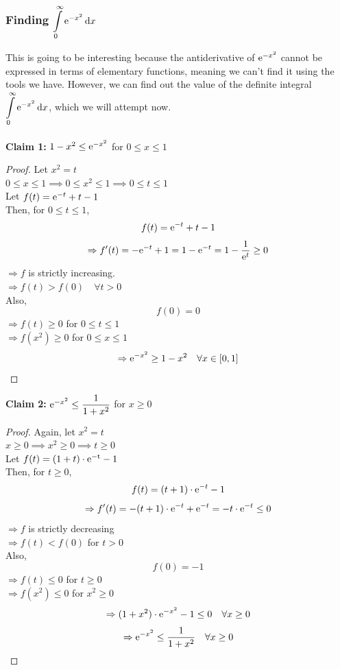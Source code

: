 \documentclass[14]{article}
\theoremstyle{definition}
\theoremstyle{case}
\begin{document}
\subsubsection{Finding $\displaystyle\int\limits_0^{\infty} {\rm e}^{-x^2} \dif x$}
This is going to be interesting because the antiderivative of ${\rm e}^{-x^2}$ cannot be expressed in terms of elementary functions, meaning we can't find it using the tools we have. However, we can find out the value of the definite integral $\displaystyle\int\limits_0^{\infty} {\rm e}^{-x^2} \dif x$, which we will attempt now.\\\\
\textbf{Claim 1:} $1-x^2 \leq {\rm e}^{-x^2}$ for $0 \leq x \leq 1$
\begin{proof}
Let $x^2 = t$\\
$0 \leq x \leq 1 \implies 0 \leq x^2 \leq 1 \implies 0 \leq t \leq 1$\\
Let $f(t) = {\rm e}^{-t} + t -1$\\
Then, for $0 \leq t \leq 1$,
\[f(t) = {\rm e}^{-t} + t - 1\]
\[\Rightarrow f'(t) =  - {\rm e}^{-t} + 1 = 1 - {\rm e}^{-t} = 1 - \dfrac1{{\rm e}^t} \geq 0\]
$\Rightarrow f$ is strictly increasing.\\
$\Rightarrow f(t) > f(0) \quad \forall t > 0$\\
Also,
\[f(0) = 0\]
$\Rightarrow f(t) \geq 0$ for $0 \leq t \leq 1$\\
$\Rightarrow f(x^2)\geq 0$ for $0 \leq x \leq 1$
\[\Rightarrow {\rm e}^{-x^2} \geq 1 - x^2 \quad \forall x \in [0, 1]\]
\end{proof}
\textbf{Claim 2:} ${\rm e}^{-x^2} \leq \dfrac1{1+x^2}$ for $x \geq 0$
\begin{proof}
Again, let $x^2 = t$\\
$x \geq 0 \implies x^2 \geq 0 \implies t \geq 0$\\
Let $f(t) = (1+t) \cdot {\rm e^{-t}} - 1$\\
Then, for $t \geq 0$,
\[f(t) = (t+1) \cdot {\rm e}^{-t} - 1\]
\[\Rightarrow f'(t) = -(t+1)\cdot{\rm e}^{-t} + {\rm e}^{-t} = -t \cdot {\rm e}^{-t} \leq 0\]
$\Rightarrow f$ is strictly decreasing\\
$\Rightarrow f(t) < f(0)$ for $t > 0$\\
Also,
\[f(0) = -1\]
$\Rightarrow f(t) \leq 0$ for $t \geq 0$\\
$\Rightarrow f(x^2) \leq 0$ for $x^2 \geq 0$
\[\Rightarrow (1+x^2) \cdot {\rm e}^{-x^2} - 1 \leq 0 \quad \forall x \geq 0\]
\[\Rightarrow {\rm e}^{-x^2} \leq \dfrac1{1+x^2} \quad \forall x \geq 0\] 
\end{proof}
\end{document}
